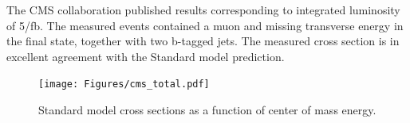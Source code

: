 	
The CMS collaboration published results corresponding to integrated luminosity of 5/fb. The measured events contained a muon and missing transverse energy in the final state, together with two b-tagged jets. The measured cross section is in excellent agreement with the Standard model prediction.\citep{Chatrchyan:2013uza}

\begin{figure}[htbp]
	\centering
		\texttt{[image: Figures/cms\_total.pdf]}
	\caption[CMS Wbb total cross section measurement]{Standard model cross sections as a function of center of mass energy.\citep{Aad:2013vka} }
	\label{fig:cms_total}
\end{figure}